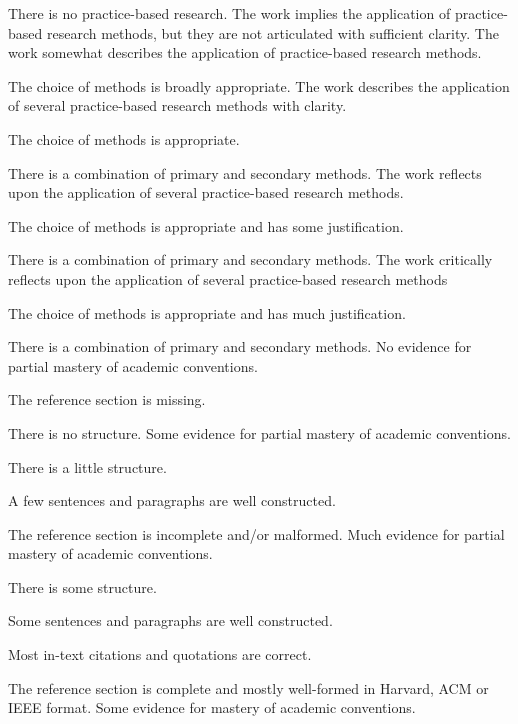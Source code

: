 \documentclass{../../fal_assignment}
\begin{document}
\begin{markingrubric}
        \grade\fail There is no practice-based research.
        \grade The work implies the application of practice-based research methods, but they are not articulated with sufficient clarity.
        \grade The work somewhat describes the application of practice-based research methods.
            \par The choice of methods is broadly appropriate.
        \grade The work describes the application of several practice-based research methods with clarity.
            \par The choice of methods is appropriate.
            \par There is a combination of primary and secondary methods.
        \grade The work reflects upon the application of several practice-based research methods.
            \par The choice of methods is appropriate and has some justification.
            \par There is a combination of primary and secondary methods.
        \grade The work critically reflects upon the application of several practice-based research methods 
            \par The choice of methods is appropriate and has much justification.
            \par There is a combination of primary and secondary methods.
%
        \grade\fail No evidence for partial mastery of academic conventions.
        \par The reference section is missing.
        \par There is no structure.
        \grade 	Some evidence for partial mastery of academic conventions.
            \par There is a little structure.
            \par A few sentences and paragraphs are well constructed.
            \par 	The reference section is incomplete and/or malformed.
        \grade Much evidence for partial mastery of academic conventions.
        \par There is some structure.
            \par Some sentences and paragraphs are well constructed.
        \par Most in-text citations and quotations are correct.
        \par The reference section is complete and mostly well-formed in Harvard, ACM or IEEE format.
        \grade Some evidence for mastery of academic conventions.

\end{markingrubric}
\end{document}
